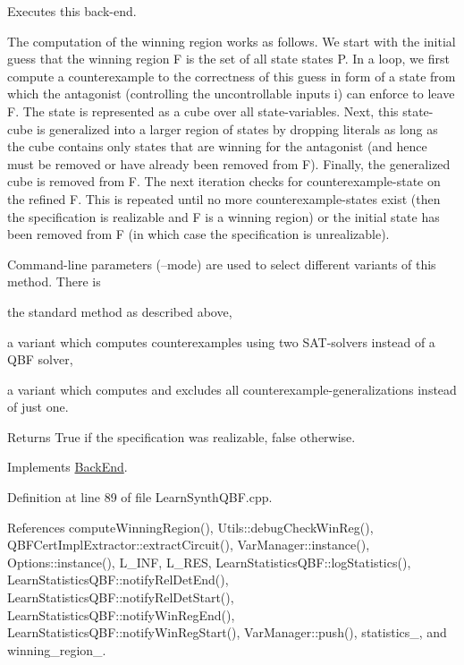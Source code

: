 Executes this back-\/end. 

The computation of the winning region works as follows. We start with the initial guess that the winning region F is the set of all state states P. In a loop, we first compute a counterexample to the correctness of this guess in form of a state from which the antagonist (controlling the uncontrollable inputs i) can enforce to leave F. The state is represented as a cube over all state-\/variables. Next, this state-\/cube is generalized into a larger region of states by dropping literals as long as the cube contains only states that are winning for the antagonist (and hence must be removed or have already been removed from F). Finally, the generalized cube is removed from F. The next iteration checks for counterexample-\/state on the refined F. This is repeated until no more counterexample-\/states exist (then the specification is realizable and F is a winning region) or the initial state has been removed from F (in which case the specification is unrealizable).

Command-\/line parameters (--mode) are used to select different variants of this method. There is 
\begin{DoxyItemize}
\item the standard method as described above, 
\item a variant which computes counterexamples using two S\-A\-T-\/solvers instead of a Q\-B\-F solver, 
\item a variant which computes and excludes all counterexample-\/generalizations instead of just one. 
\end{DoxyItemize}

\begin{DoxyReturn}{Returns}
True if the specification was realizable, false otherwise. 
\end{DoxyReturn}


Implements \hyperlink{classBackEnd_a099e717dc71e9cc2d838b1ca86340590}{Back\-End}.



Definition at line 89 of file Learn\-Synth\-Q\-B\-F.\-cpp.



References compute\-Winning\-Region(), Utils\-::debug\-Check\-Win\-Reg(), Q\-B\-F\-Cert\-Impl\-Extractor\-::extract\-Circuit(), Var\-Manager\-::instance(), Options\-::instance(), L\-\_\-\-I\-N\-F, L\-\_\-\-R\-E\-S, Learn\-Statistics\-Q\-B\-F\-::log\-Statistics(), Learn\-Statistics\-Q\-B\-F\-::notify\-Rel\-Det\-End(), Learn\-Statistics\-Q\-B\-F\-::notify\-Rel\-Det\-Start(), Learn\-Statistics\-Q\-B\-F\-::notify\-Win\-Reg\-End(), Learn\-Statistics\-Q\-B\-F\-::notify\-Win\-Reg\-Start(), Var\-Manager\-::push(), statistics\-\_\-, and winning\-\_\-region\-\_\-.



